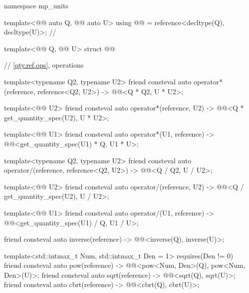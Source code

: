 \begin{codeblock}
namespace mp_units {

template<@@ auto Q, @@ auto U>
using @@ = reference<decltype(Q), decltype(U)>;  // \expos

template<@@ Q, @@ U>
struct @@ {
  // \ref{qty.ref.ops}, operations

  template<typename Q2, typename U2>
  friend consteval auto operator*(reference, reference<Q2, U2>)
    -> @@<Q{} * Q2{}, U{} * U2{}>;

  template<@@ U2>
  friend consteval auto operator*(reference, U2)
    -> @@<Q{} * get_quantity_spec(U2{}), U{} * U2{}>;

  template<@@ U1>
  friend consteval auto operator*(U1, reference)
    -> @@<get_quantity_spec(U1{}) * Q{}, U1{} * U{}>;

  template<typename Q2, typename U2>
  friend consteval auto operator/(reference, reference<Q2, U2>)
    -> @@<Q{} / Q2{}, U{} / U2{}>;

  template<@@ U2>
  friend consteval auto operator/(reference, U2)
    -> @@<Q{} / get_quantity_spec(U2{}), U{} / U2{}>;

  template<@@ U1>
  friend consteval auto operator/(U1, reference)
    -> @@<get_quantity_spec(U1{}) / Q{}, U1{} / U{}>;

  friend consteval auto inverse(reference) -> @@<inverse(Q{}), inverse(U{})>;

  template<std::intmax_t Num, std::intmax_t Den = 1>
    requires(Den != 0)
  friend consteval auto pow(reference) -> @@<pow<Num, Den>(Q{}), pow<Num, Den>(U{})>;
  friend consteval auto sqrt(reference) -> @@<sqrt(Q{}), sqrt(U{})>;
  friend consteval auto cbrt(reference) -> @@<cbrt(Q{}), cbrt(U{})>;

}}
\end{codeblock}
